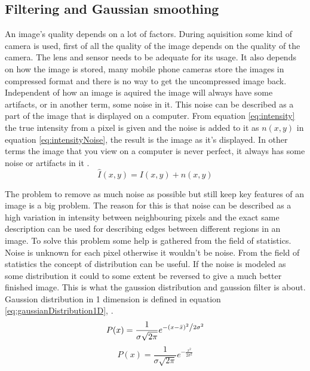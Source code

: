 \subsection{Filtering and Gaussian smoothing}
An image's quality depends on a lot of factors. During aquisition some kind of
camera is used, first of all the quality of the image depends on the quality
of the camera. The lens and sensor needs to be adequate for its usage.
It also depends on how the image is stored, many mobile phone cameras store
the images in compressed format and there is no way to get the uncompressed
image back. Independent of how an image is aquired the image will always have
some artifacts, or in another term, some noise in it. This noise can be described
as a part of the image that is displayed on a computer. From equation \ref{eq:intensity}
 the true intensity from a pixel is given and the noise is added to it as \(n(x,y)\) in
 equation \ref{eq:intensityNoise}, the result is the image as it's displayed. In other
 terms the image that you view on a computer is never perfect, it always has some
 noise or artifacts in it \cite[p. 76]{gonzalez2008}.
\begin{equation}
    \label{eq:intensityNoise}
    \hat{I}(x,y) = I(x,y) + n(x,y)
\end{equation}

The problem to remove as much noise as possible but still keep key features of
an image is a big problem. The reason for this is that noise can be described
as a high variation in intensity between neighbouring pixels and the exact
same description can be used for describing edges between different regions
in an image. To solve this problem some help is gathered from the field of
statistics. Noise is unknown for each pixel otherwise it wouldn't be noise.
From the field of statistics the concept of distribution can be
useful. If the noise is modeled as some distribution it could to some extent
be reversed to give a much better finished image. This is what the
gaussion distribution and gaussion filter is about. Gaussion distribution in 1
dimension is defined in equation \ref{eq:gaussianDistribution1D}, \cite[p. 314]{gonzalez2008}.
\begin{equation}
    \label{eq:gaussianDistribution1D}
    P(x) = \frac{1}{{\sigma \sqrt {2\pi } }}e^{{{ - \left( {x - \bar{x}} \right)^2 } \mathord{\left/ {\vphantom {{ - \left( {x - \mu } \right)^2 } {2\sigma ^2 }}} \right. \kern-\nulldelimiterspace} {2\sigma ^2 }}}
\end{equation}
\begin{equation}
    \label{eq:gaussianDistribution1DZeroMean}
    P(x) = \frac{1}{{\sigma \sqrt {2\pi } }}e^{-\frac{x^2}{2 \sigma^2}}
\end{equation}

